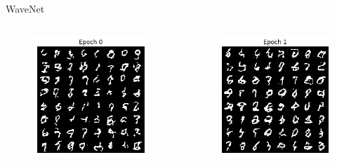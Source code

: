 \begin{frame}[allowframebreaks]{WaveNet}
\begin{columns}
\begin{column}{0.18\linewidth}
\begin{figure}
                \includegraphics[width=1\linewidth]{images/autoregressive/mnist/coord-epoch-0.png}
            \end{figure}
        \end{column}
        \begin{column}{0.18\linewidth}
            \begin{figure}
                \centering
                \includegraphics[width=1\linewidth]{images/autoregressive/mnist/coord-epoch-1.png}

\end{figure}
\end{column}
\end{columns}
\end{frame}
